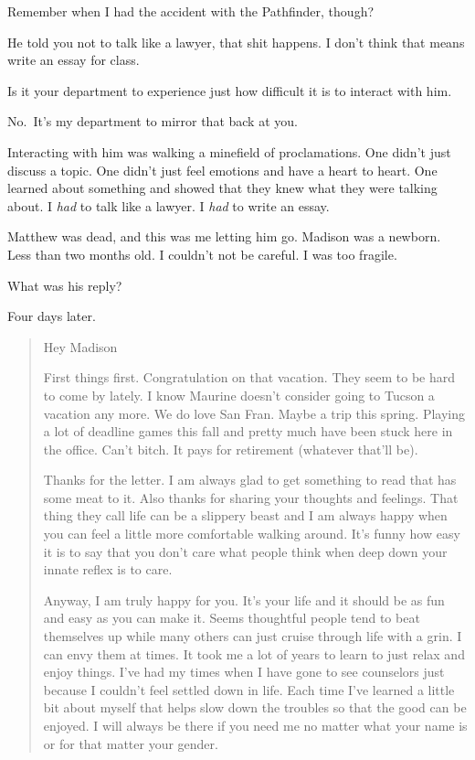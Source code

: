\begin{paracol}{2}
\begin{leftcolumn}
Remember when I had the accident with the Pathfinder, though?

\begin{ally}
He told you not to talk like a lawyer, that shit happens. I don't think that means write an essay for class.
\end{ally}
Is it your department to experience just how difficult it is to interact with him.

\begin{ally}
No.~It's my department to mirror that back at you.
\end{ally}
Interacting with him was walking a minefield of proclamations. One didn't just discuss a topic. One didn't just feel emotions and have a heart to heart. One learned about something and showed that they knew what they were talking about. I \emph{had} to talk like a lawyer. I \emph{had} to write an essay.

Matthew was dead, and this was me letting him go. Madison was a newborn. Less than two months old. I couldn't not be careful. I was too fragile.

\begin{ally}
What was his reply?
\end{ally}
Four days later.

\begin{quotation}
Hey Madison

First things first. Congratulation on that vacation. They seem to be hard to come by lately. I know Maurine doesn't consider going to Tucson a vacation any more. We do love San Fran. Maybe a trip this spring. Playing a lot of deadline games this fall and pretty much have been stuck here in the office. Can't bitch. It pays for retirement (whatever that'll be).

Thanks for the letter. I am always glad to get something to read that has some meat to it. Also thanks for sharing your thoughts and feelings. That thing they call life can be a slippery beast and I am always happy when you can feel a little more comfortable walking around. It's funny how easy it is to say that you don't care what people think when deep down your innate reflex is to care.

Anyway, I am truly happy for you. It's your life and it should be as fun and easy as you can make it. Seems thoughtful people tend to beat themselves up while many others can just cruise through life with a grin. I can envy them at times.  It took me a lot of years to learn to just relax and enjoy things. I've had my times when I have gone to see counselors just because I couldn't feel settled down in life. Each time I've learned a little bit about myself that helps slow down the troubles so that the good can be enjoyed. I will always be there if you need me no  matter what your name is or for that matter your gender.


\end{quotation}
\end{leftcolumn}
\end{paracol}
